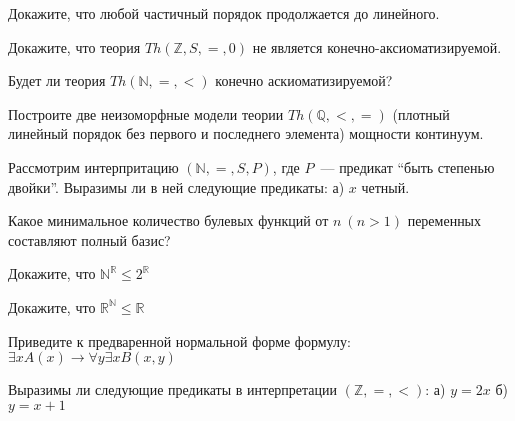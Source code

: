 \begin{task}
    Докажите, что любой частичный порядок продолжается до линейного.
\end{task}

\begin{task}
    Докажите, что теория $Th(\mathbb{Z}, S, =, 0)$ не является
    конечно-аксиоматизируемой.
\end{task}

\begin{task}
    Будет ли теория $Th(\mathbb{N}, =, <)$ конечно аскиоматизируемой?
\end{task}

\begin{task}
    Построите две неизоморфные модели теории $Th(\mathbb{Q}, <, =)$
    (плотный линейный порядок без первого и последнего элемента)
    мощности континуум.
\end{task}

\begin{task}
    Рассмотрим интерпритацию $(\mathbb{N}, =, S, P)$, где $P$~---
    предикат ``быть степенью двойки''.
    Выразимы ли в ней следующие предикаты:
    а) $x$ четный.
\end{task}

\begin{task}
    Какое минимальное количество булевых функций от $n~ (n > 1)$
    переменных составляют полный базис?
\end{task}

\begin{task}
    Докажите, что $\mathbb{N}^{\mathbb{R}} \le 2^{\mathbb{R}}$
\end{task}

\begin{task}
    Докажите, что $\mathbb{R}^{\mathbb{N}} \le \mathbb{R}$
\end{task}

\begin{task}
    Приведите к предваренной нормальной форме формулу:
    $\exists x A(x) \rightarrow  \forall y \exists x B(x, y)$
\end{task}

\begin{task}
    Выразимы ли следующие предикаты в интерпретации
    $(\mathbb{Z}, =, <)$:
    а) $y = 2x$
    б) $y = x + 1$
\end{task}
